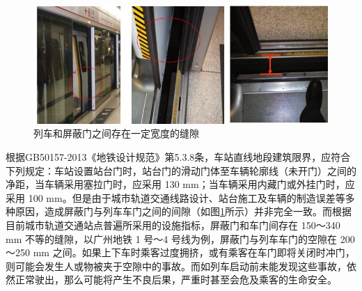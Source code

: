 \begin{figure}[htbp]
	\centering
	\includegraphics[scale=0.8]{Fig/屏蔽门缝隙.jpg}
	\caption{\label{屏蔽门缝隙}列车和屏蔽门之间存在一定宽度的缝隙}
\end{figure}
根据GB50157-2013《地铁设计规范》第5.3.8条\cite{地铁设计规范}，车站直线地段建筑限界，应符合下列规定：车站设置站台门时，站台门的滑动门体至车辆轮廓线（未开门）之间的净距，当车辆采用塞拉门时，应采用 130 mm；当车辆采用内藏门或外挂门时，应采用 100 mm。但是由于城市轨道交通线路设计、站台施工及车辆的制造误差等多种原因，造成屏蔽门与列车车门之间的间隙（如图\ref{屏蔽门缝隙}所示）并非完全一致。而根据目前城市轨道交通站点普遍所采用的设施指标，屏蔽门和车门间存在 150～340 mm 不等的缝隙，以广州地铁 1 号～4 号线为例，屏蔽门与列车车门的空隙在 200～250 mm 之间\cite{陈铸昌2017屏蔽门与列车之间防夹装置应用分析及展望}。如果上下车时乘客过度拥挤，或有乘客在车门即将关闭时冲门，则可能会发生人或物被夹于空隙中的事故。而如列车启动前未能发现这些事故，依然正常驶出，那么可能将产生不良后果，严重时甚至会危及乘客的生命安全。

